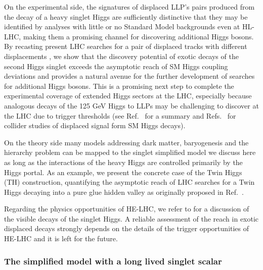 On the experimental side, the signatures of displaced LLP's pairs produced from the decay of a heavy singlet Higgs are sufficiently distinctive that they may be identified by analyses with little or no Standard Model backgrounds even at HL-LHC, making them a promising channel for discovering additional Higgs bosons. By recasting present LHC searches for a pair of displaced tracks with different displacements \cite{Aad:2015uaa,CMS:2014wda,Aaboud:2018aqj,Sirunyan:2018pwn}, we show that the discovery potential of exotic decays of the second Higgs singlet exceeds the asymptotic reach of SM Higgs coupling deviations and provides a natural avenue for the further development of searches for additional Higgs bosons. This is a promising next step to complete the experimental coverage of extended Higgs sectors at the LHC, especially because analogous decays of the 125 GeV Higgs to LLPs may be challenging to discover at the LHC due to trigger thresholds (see Ref.~\cite{Curtin:2013fra} for a summary and Refs.~\cite{Clarke:2015ala,Csaki:2015fba,Curtin:2015fna,Pierce:2017taw} for collider studies of displaced signal form SM Higgs decays).
  
On the theory side many models addressing dark matter, baryogenesis and the hierarchy problem can be mapped to the singlet simplified model we discuss here as long as the interactions of the heavy Higgs are controlled primarily by the Higgs portal. As an example, we present the concrete case of the Twin Higgs (TH) construction, quantifying the asymptotic reach of LHC searches for a Twin Higgs decaying into a pure glue hidden valley as originally proposed in Ref.~\cite{Craig:2015pha}. 

Regarding the physics opportunities of HE-LHC, we refer to \cite{CidVidal:2018eel} for a discussion of the visible decays of the singlet Higgs. A reliable assessment of the reach in exotic displaced decays strongly depends on the details of the trigger opportunities of HE-LHC and it is left for the future.    

\subsubsection{The simplified model with a long lived singlet scalar}


